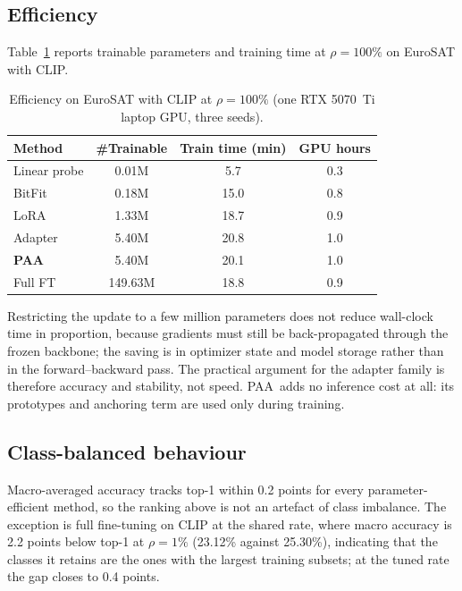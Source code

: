\documentclass[preprint,12pt]{elsarticle}
\newcommand{\ours}{\textsc{PAA}}
\begin{document}
\subsection{Efficiency}

Table~\ref{tab:efficiency} reports trainable parameters and training time at
$\rho=100\%$ on EuroSAT with CLIP.

\begin{table}[t]
\centering
\caption{Efficiency on EuroSAT with CLIP at $\rho=100\%$ (one RTX 5070~Ti
laptop GPU, three seeds).}
\label{tab:efficiency}
\small
\setlength{\tabcolsep}{6pt}
\begin{tabular}{lccc}
\toprule
Method & \#Trainable & Train time (min) & GPU hours \\
\midrule
Linear probe & 0.01M & 5.7 & 0.3 \\
BitFit       & 0.18M & 15.0 & 0.8 \\
LoRA         & 1.33M & 18.7 & 0.9 \\
Adapter      & 5.40M & 20.8 & 1.0 \\
\textbf{\ours} & 5.40M & 20.1 & 1.0 \\
Full FT      & 149.63M & 18.8 & 0.9 \\
\bottomrule
\end{tabular}
\end{table}

Restricting the update to a few million parameters does not reduce wall-clock
time in proportion, because gradients must still be back-propagated through the
frozen backbone; the saving is in optimizer state and model storage rather than
in the forward--backward pass. The practical argument for the adapter family is
therefore accuracy and stability, not speed. \ours\ adds no inference cost at
all: its prototypes and anchoring term are used only during training.

\subsection{Class-balanced behaviour}

Macro-averaged accuracy tracks top-1 within 0.2 points for every
parameter-efficient method, so the ranking above is not an artefact of class
imbalance. The exception is full fine-tuning on CLIP at the shared rate, where macro
accuracy is 2.2 points below top-1 at $\rho=1\%$ (23.12\% against 25.30\%),
indicating that the classes it retains are the ones with the largest training
subsets; at the tuned rate the gap closes to 0.4 points.
\end{document}
